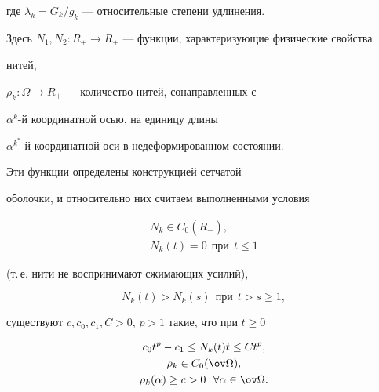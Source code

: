 где $\lambda_k=G_k/g_k$ --- относительные степени удлинения.





Здесь $N_1,N_2:R_+\to R_+$ --- функции, характеризующие физические свойства


нитей,\linebreak


$\rho_k:\Omega \to R_+$ --- количество нитей, сонаправленных с 


$\alpha^k$-й координатной осью, на единицу длины \linebreak


$\alpha^{k^*}$-й координатной оси в недеформированном состоянии. 


Эти функции определены конструкцией сетчатой 


оболочки, и относительно них считаем выполненными условия


\begin{gather}


N_k \in C_0(R_+),


\label{N1} \\


%


N_k(t)=0 \ \ \text{при}\ \ t \le 1 


\label{N2}


\end{gather}


(т.\,е. нити не воспринимают сжимающих усилий), 


\begin{equation}


N_k(t)>N_k(s)\ \ \text{при}\ \ t>s \ge 1, 


\label{N11}


\end{equation}


существуют $c,c_0,c_1,C > 0$, $p>1$ такие, что при $t \ge 0$


\begin{gather}


c_0 t^p - c_1 \le N_k (t)t \le C t^p, \label{N3} \\


%


\rho_k \in C_0 (\ov \Omega), \label{ro1} \\


%


\rho_k(\alpha) \geq c > 0 \ \ \forall\alpha\in \ov \Omega . \label{ro2}


\end{gather}





